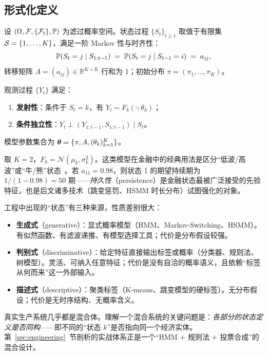 \subsection{形式化定义}

\begin{definition}[状态过程]
\label{def:state}
设 $(\Omega, \mathcal{F}, \{\mathcal{F}_t\}, \mathbb{P})$ 为滤过概率空间。状态过程 $\{S_t\}_{t\ge 1}$ 取值于有限集 $\mathcal{S} = \{1, \dots, K\}$，满足一阶 Markov 性与时齐性：
\begin{equation}
\mathbb{P}(S_t = j \mid S_{1:t-1}) \;=\; \mathbb{P}(S_t = j \mid S_{t-1} = i) \;=\; a_{ij},
\end{equation}
转移矩阵 $A = (a_{ij}) \in \mathbb{R}^{K \times K}$ 行和为 $1$；初始分布 $\pi = (\pi_1, \dots, \pi_K)$。
\end{definition}

\begin{definition}
观测过程 $\{Y_t\}$ 满足：
\begin{enumerate}[itemsep=1pt]
\item \textbf{发射性}：条件于 $S_t = k$，有 $Y_t \sim F_k(\cdot; \theta_k)$；
\item \textbf{条件独立性}：$Y_t \perp (Y_{1:t-1}, S_{1:t-1}) \mid S_t$。
\end{enumerate}
模型参数集合为 $\bm{\theta} = \{\pi, A, (\theta_k)_{k=1}^{K}\}$。
\end{definition}

\begin{example}
取 $K = 2$，$F_k = \mathcal{N}(\mu_k, \sigma_k^2)$。这类模型在金融中的经典用法是区分“低波/高波”或“牛/熊”状态~\cite{hamilton1989,ang2012}。若 $a_{11} = 0.98$，则状态 1 的期望持续期为 $1/(1-0.98) = 50$ 期——\emph{持久性}（persistence）是金融状态最被广泛接受的先验特征，也是后文诸多技术（跳变惩罚、HSMM 时长分布）试图强化的对象。
\end{example}

\begin{remark}
工程中出现的“状态”有三种来源，性质差别很大：
\begin{itemize}[itemsep=2pt]
\item \textbf{生成式}（generative）：显式概率模型（HMM、Markov-Switching、HSMM）。有似然函数、有滤波递推、有模型选择工具；代价是分布假设较强。
\item \textbf{判别式}（discriminative）：给定特征直接输出标签或概率（分类器、规则法、树模型）。灵活、可纳入任意特征；代价是没有自洽的概率语义，且依赖“标签从何而来”这一外部输入。
\item \textbf{描述式}（descriptive）：聚类标签（K-means、跳变模型的硬标签）。无分布假设；代价是无时序结构、无概率含义。
\end{itemize}
真实生产系统几乎都是混合体。理解一个混合系统的关键问题是：\emph{各部分的状态定义是否同构}——即不同的“状态 $k$”是否指向同一个经济实体。第~\ref{sec:engineering}~节剖析的实战体系正是一个“HMM $+$ 规则法 $+$ 投票合成”的混合设计。
\end{remark}

